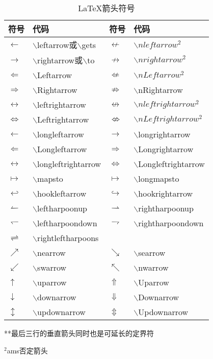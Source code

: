 \documentclass[UTF8,fontset=ubuntu]{ctexart}
\begin{document}
\begin{table}
\begin{tabular}{l l l l}
	\hline
	符号 & 代码 & 符号 & 代码\\
	\hline
	$\gets$ & $\backslash$leftarrow或$\backslash$gets & $\nleftarrow$ & $\backslash nleftarrow^2$\\
	$\to$ & $\backslash$rightarrow或$\backslash$to & $\nrightarrow$ & $\backslash nrightarrow^2$\\
	$\Leftarrow$ & $\backslash$Leftarrow & $\nLeftarrow$ & $\backslash nLeftarrow^2$\\
	$\Rightarrow$ & $\backslash$Rightarrow & $\nRightarrow$ & $\backslash$nRightarrow\\
	$\leftrightarrow$ & $\backslash$leftrightarrow & $\nleftrightarrow$ & $\backslash nleftrightarrow^2$\\
	$\Leftrightarrow$ & $\backslash$Leftrightarrow & $\nLeftrightarrow$ & $\backslash nLeftrightarrow^2$\\
	$\longleftarrow$ & $\backslash$longleftarrow & $\longrightarrow$ & $\backslash$longrightarrow\\
	$\Longleftarrow$ & $\backslash$Longleftarrow & $\Longrightarrow$ & $\backslash$Longrightarrow\\
	$\longleftrightarrow$ & $\backslash$longleftrightarrow & $\Longleftrightarrow$ & $\backslash$Longleftrightarrow\\
	$\mapsto$ & $\backslash$mapsto & $\longmapsto$ & $\backslash$longmapsto\\
	$\hookleftarrow$ & $\backslash$hookleftarrow & $\hookrightarrow$ & $\backslash$hookrightarrow\\
	$\leftharpoonup$ & $\backslash$leftharpoonup & $\rightharpoonup$ & $\backslash$rightharpoonup\\
	$\leftharpoondown$ & $\backslash$leftharpoondown & $\rightharpoondown$ & $\backslash$rightharpoondown\\
	$\rightleftharpoons$ & $\backslash$rightleftharpoons\\
	$\nearrow$ & $\backslash$nearrow & $\searrow$ & $\backslash$searrow\\
	$\swarrow$ & $\backslash$swarrow & $\nwarrow$ & $\backslash$nwarrow\\
	$\uparrow$ & $\backslash$uparrow & $\Uparrow$ & $\backslash$Uparrow\\
	$\downarrow$ & $\backslash$downarrow & $\Downarrow$ & $\backslash$Downarrow\\
	$\updownarrow$ & $\backslash$updownarrow & $\Updownarrow$ & $\backslash$Updownarrow\\
	\hline
\end{tabular}\par
**最后三行的垂直箭头同时也是可延长的定界符\par
${}^2$\hspace{2pt}ams否定箭头
\caption{\LaTeX 箭头符号}
\end{table}
\end{document}
